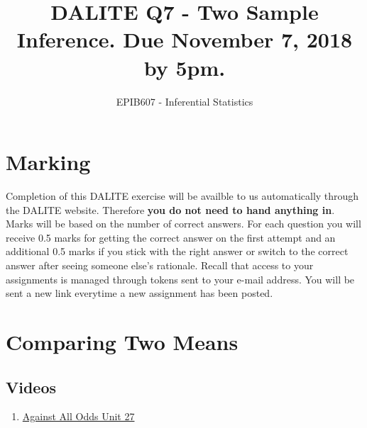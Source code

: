 \documentclass[letterpaper,9pt,twoside,printwatermark=false]{pinp}
\title{DALITE Q7 - Two Sample Inference. Due November 7, 2018 by 5pm.}
\author[a]{EPIB607 - Inferential Statistics}
\affil[a]{Fall 2018, McGill University}
\providecommand{\tightlist}{%
  \setlength{\itemsep}{0pt}\setlength{\parskip}{0pt}}
\begin{document}
\verticaladjustment{-2pt}

\maketitle
\thispagestyle{firststyle}



\section*{Marking}\label{marking}

Completion of this DALITE exercise will be availble to us automatically
through the DALITE website. Therefore \textbf{you do not need to hand
anything in}. Marks will be based on the number of correct answers. For
each question you will receive 0.5 marks for getting the correct answer
on the first attempt and an additional 0.5 marks if you stick with the
right answer or switch to the correct answer after seeing someone else's
rationale. Recall that access to your assignments is managed through
tokens sent to your e-mail address. You will be sent a new link
everytime a new assignment has been posted.

\section{Comparing Two Means}\label{comparing-two-means}

\subsection{Videos}\label{videos}

\begin{enumerate}
\def\labelenumi{\arabic{enumi}.}
\tightlist
\item
  \href{https://www.learner.org/courses/againstallodds/unitpages/unit27.html}{Against
  All Odds Unit 27}
\end{enumerate}
\end{document}
